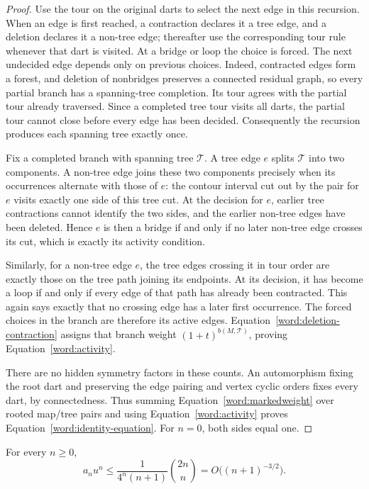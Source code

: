 \begin{proof}
Use the tour on the original darts to select the next edge in this
recursion. When an edge is first reached, a contraction declares it a
tree edge, and a deletion declares it a non-tree edge; thereafter use
the corresponding tour rule whenever that dart is visited. At a bridge
or loop the choice is forced. The next undecided edge depends only on
previous choices. Indeed, contracted edges form a forest, and deletion
of nonbridges preserves a connected residual graph, so every partial
branch has a spanning-tree completion. Its tour agrees with the partial
tour already traversed. Since a completed tree tour visits all darts,
the partial tour cannot close before every edge has been decided.
Consequently the recursion produces each spanning tree exactly once.

Fix a completed branch with spanning tree $\mathcal T$. A tree edge $e$
splits $\mathcal T$ into two components. A non-tree edge joins these two
components precisely when its occurrences alternate with those of $e$:
the contour interval cut out by the pair for $e$ visits exactly one side
of this tree cut. At the decision for $e$, earlier tree contractions
cannot identify the two sides, and the earlier non-tree edges have been
deleted. Hence $e$ is then a bridge if and only if no later non-tree
edge crosses its cut, which is exactly its activity condition.

Similarly, for a non-tree edge $e$, the tree edges crossing it in tour
order are exactly those on the tree path joining its endpoints. At its
decision, it has become a loop if and only if every edge of that path
has already been contracted. This again says exactly that no crossing
edge has a later first occurrence. The forced choices in the branch
are therefore its active edges. Equation~\eqref{word:deletion-contraction}
assigns that branch weight $(1+t)^{b(M,\mathcal T)}$, proving
Equation~\eqref{word:activity}.

There are no hidden symmetry factors in these counts. An automorphism
fixing the root dart and preserving the edge pairing and vertex cyclic
orders fixes every dart, by connectedness. Thus summing
Equation~\eqref{word:markedweight} over rooted map/tree pairs and using
Equation~\eqref{word:activity} proves
Equation~\eqref{word:identity-equation}. For $n=0$, both sides equal one.
\end{proof}

\begin{corollary}\label{word:catalan}
For every $n\ge0$,
\begin{equation}\label{word:catalan-equation}
 a_nu^n\le \frac{1}{4^n(n+1)}\binom{2n}{n}
          =O\bigl((n+1)^{-3/2}\bigr).
\end{equation}
\end{corollary}

